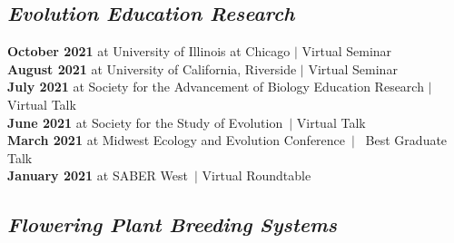 \documentclass[]{article}
\begin{document}
\subsection{\fontsize{12}{36}\selectfont \textit{Evolution Education Research}}

\textbf{October 2021} at University of Illinois at Chicago $\vert$ Virtual Seminar \hspace{0.3mm} \href{https://ledelaney.org/talks/2021defense}{\faImages} \href{https://github.com/ledelaney/10-21-Defense}{\faGithub}\\
\textbf{August 2021} at University of California, Riverside $\vert$ Virtual Seminar \hspace{0.3mm} \href{https://ledelaney.org/talks/2021ucr}{\faImages} \href{https://github.com/ledelaney/08-21-UCR}{\faGithub}\\
\textbf{July 2021} at Society for the Advancement of Biology Education Research $\vert$ Virtual Talk \hspace{0.3mm} \href{https://uofi.box.com/v/2021saber-talk}{\faVideo} \href{https://ledelaney.org/talks/2021saber}{\faImages} \href{https://github.com/ledelaney/07-21-SABER}{\faGithub}\\
\textbf{June 2021} at Society for the Study of Evolution\ $\vert$ Virtual Talk \hspace{0.3mm} \href{https://uofi.box.com/v/2021evolution}{\faVideo} \href{https://ledelaney.org/talks/2021evolution}{\faImages} \href{https://github.com/ledelaney/06-21-Evolution}{\faGithub}\\
\textbf{March 2021} at Midwest Ecology and Evolution Conference\ $\vert$ \faAward\ Best Graduate Talk\ \hspace{0.1mm} \href{https://uofi.box.com/v/2021meec-talk}{\faVideo} \href{https://ledelaney.org/talks/2021meec/}{\faImages} \href{https://github.com/ledelaney/03-21-MEEC}{\faGithub}\\
\textbf{January 2021} at SABER West\ $\vert$ Virtual Roundtable \hspace{0.4mm} \href{https://ledelaney.org/talks/2021saberw/}{\faImages} \href{https://github.com/ledelaney/01-21-SABERwest}{\faGithub}

\vspace{-5mm}

\subsection{\fontsize{12}{36}\selectfont \textit{Flowering Plant Breeding Systems}}
\end{document}
